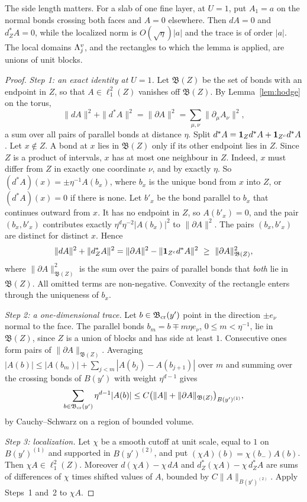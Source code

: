 The side length matters. For a slab of one fine layer, at $U=1$, put $A_1=a$ on the normal bonds crossing both faces and $A=0$ elsewhere. Then $dA=0$ and $d^*_ZA=0$, while the localized norm is $O(\sqrt\eta)|a|$ and the trace is of order $|a|$. The local domains $\Lambda^v_j$, and the rectangles to which the lemma is applied, are unions of unit blocks.

\begin{proof}
\emph{Step 1: an exact identity at $U=1$.} Let $\mathfrak B(Z)$ be the set of bonds with an endpoint in $Z$, so that $A\in\ell^2_1(Z)$ vanishes off $\mathfrak B(Z)$. By Lemma~\ref{lem:hodge} on the torus,
\[
\|dA\|^2+\|d^*A\|^2=\|\partial A\|^2=\sum_{\mu,\nu}\|\partial_\mu A_\nu\|^2,
\]
a sum over all pairs of parallel bonds at distance $\eta$. Split $d^*A=\mathbf 1_Zd^*A+\mathbf 1_{Z^c}d^*A$. Let $x\notin Z$. A bond at $x$ lies in $\mathfrak B(Z)$ only if its other endpoint lies in $Z$. Since $Z$ is a product of intervals, $x$ has at most one neighbour in $Z$. Indeed, $x$ must differ from $Z$ in exactly one coordinate $\nu$, and by exactly $\eta$. So $(d^*A)(x)=\pm\eta^{-1}A(b_x)$, where $b_x$ is the unique bond from $x$ into $Z$, or $(d^*A)(x)=0$ if there is none. Let $b'_x$ be the bond parallel to $b_x$ that continues outward from $x$. It has no endpoint in $Z$, so $A(b'_x)=0$, and the pair $(b_x,b'_x)$ contributes exactly $\eta^d\eta^{-2}|A(b_x)|^2$ to $\|\partial A\|^2$. The pairs $(b_x,b'_x)$ are distinct for distinct $x$. Hence
\[
\|dA\|^2+\|d^*_ZA\|^2=\|\partial A\|^2-\|\mathbf 1_{Z^c}d^*A\|^2\ \ge\ \|\partial A\|^2_{\mathfrak B(Z)},
\]
where $\|\partial A\|^2_{\mathfrak B(Z)}$ is the sum over the pairs of parallel bonds that \emph{both} lie in $\mathfrak B(Z)$. All omitted terms are non-negative. Convexity of the rectangle enters through the uniqueness of $b_x$.

\emph{Step 2: a one-dimensional trace.} Let $b\in\mathfrak B_{\rm cr}(y')$ point in the direction $\pm e_\nu$ normal to the face. The parallel bonds $b_m=b\mp m\eta e_\nu$, $0\le m<\eta^{-1}$, lie in $\mathfrak B(Z)$, since $Z$ is a union of blocks and has side at least $1$. Consecutive ones form pairs of $\|\partial A\|_{\mathfrak B(Z)}$. Averaging $|A(b)|\le|A(b_m)|+\sum_{j<m}|A(b_j)-A(b_{j+1})|$ over $m$ and summing over the crossing bonds of $B(y')$ with weight $\eta^{d-1}$ gives
\[
\sum_{b\in\mathfrak B_{\rm cr}(y')}\eta^{d-1}|A(b)|\le C\big(\|A\|+\|\partial A\|_{\mathfrak B(Z)}\big)_{B(y')^{(1)}},
\]
by Cauchy--Schwarz on a region of bounded volume.

\emph{Step 3: localization.} Let $\chi$ be a smooth cutoff at unit scale, equal to $1$ on $B(y')^{(1)}$ and supported in $B(y')^{(2)}$, and put $(\chi A)(b)=\chi(b_-)A(b)$. Then $\chi A\in\ell^2_1(Z)$. Moreover $d(\chi A)-\chi\,dA$ and $d^*_Z(\chi A)-\chi\,d^*_ZA$ are sums of differences of $\chi$ times shifted values of $A$, bounded by $C\|A\|_{B(y')^{(2)}}$. Apply Steps~1 and~2 to $\chi A$.


\end{proof}
